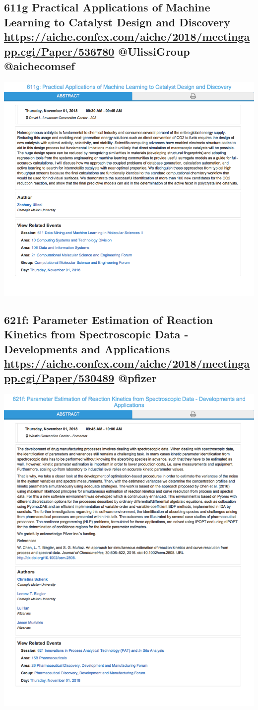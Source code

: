 \documentclass[11pt]{article}
\begin{document}
\subsection{611g Practical Applications of Machine Learning to Catalyst Design and Discovery \url{https://aiche.confex.com/aiche/2018/meetingapp.cgi/Paper/536780} @UlissiGroup @aichecomsef}
\label{sec:orgdeb055f}
\begin{center}
\includegraphics[width=.9\linewidth]{./536780.png}
\end{center}
\subsection{621f: Parameter Estimation of Reaction Kinetics from Spectroscopic Data - Developments and Applications \url{https://aiche.confex.com/aiche/2018/meetingapp.cgi/Paper/530489} @pfizer}
\label{sec:org0ba3af5}
\begin{center}
\includegraphics[width=.9\linewidth]{./530489.png}
\end{center}
\end{document}
